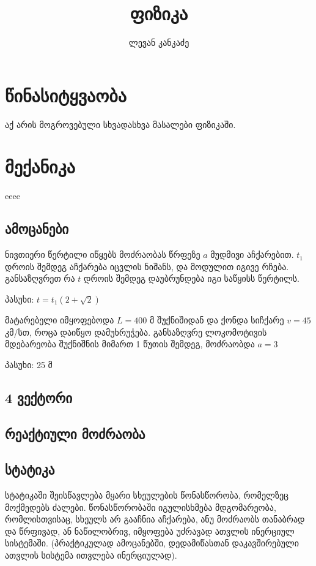 \documentclass{book}
\title{ფიზიკა}
\author{ლევან კანკაძე}
\begin{document}
\maketitle

\tableofcontents

\chapter{წინასიტყვაობა}
აქ არის მოგროვებული სხვადასხვა მასალები ფიზიკაში.


\chapter{მექანიკა}
eeee
\section{ამოცანები}
ნივთიერი წერტილი იწყებს მოძრაობას წრფეზე $a$ მუდმივი აჩქარებით. $t_1$ დროის შემდეგ აჩქარება იცვლის ნიშანს, და მოდულით იგივე რჩება.
განსაზღვრეთ რა $t$ დროის შემდეგ დაუბრუნდება იგი საწყისს წერტილს.

პასუხი: $t = t_1(2 + \sqrt{2})$

მატარებელი იმყოფებოდა $L = 400$ მ შუქნიშიდან და ქონდა სიჩქარე $v = 45$ კმ/სთ, როცა დაიწყო დამუხრუჭება. 
განსაზღვრე ლოკომოტივის მდებარეობა შუქნიშნის მიმართ 1 წუთის შემდეგ, მოძრაობდა $a = 3$

პასუხი: 25 მ

\section{4 ვექტორი}

\section{რეაქტიული მოძრაობა}

\section{სტატიკა} სტატიკაში შეისწავლება მყარი სხეულების წონასწორობა, რომელზეც მოქმედებს ძალები. წონასწორობაში იგულისხმება მდგომარეობა, რომლისთვისაც, სხეულს არ გააჩნია აჩქარება, ანუ მოძრაობს თანაბრად და წრფივად, ან ნაწილობრივ, იმყოფება უძრავად ათვლის ინერციულ სისტემაში. (პრაქტიკულად ამოცანებში, დედამიწასთან დაკავშირებული ათვლის სისტემა ითვლება ინერციულად).
\end{document}
